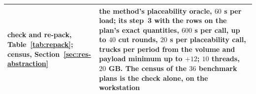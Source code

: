 \begin{table}[!t]
\begin{tabular}{@{}p{}p{}p{}@{}}
check and re-pack, Table~\ref{tab:repack}; census, Section~\ref{sec:res-abstraction} & \multicolumn{2}{p{0.67\textwidth}}{the method's placeability oracle, $60$ s per load; its step~3 with the rows on the plan's exact quantities, $600$ s per call, up to $40$ cut rounds, $20$ s per placeability call, trucks per period from the volume and payload minimum up to $+12$; $10$ threads, $20$ GB. The census of the $36$ benchmark plans is the check alone, on the workstation} \\
\bottomrule
\end{tabular}
\end{table}

